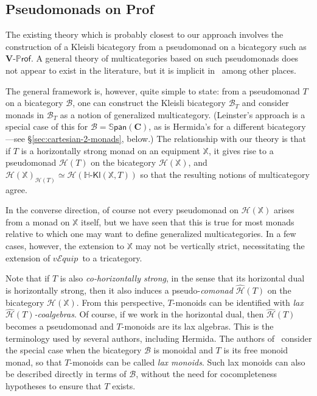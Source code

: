\documentclass{tac}
\makeatletter
\newcommand{\calH}{\ensuremath{\mathcal{H}}}
\newcommand{\mb}[1]{{\mathbf{#1}}}
\newcommand{\PROF}[1]{\mathbf{#1}\mbox{-}\mathbb{P}\mathsf{rof}}
\newcommand{\SPAN}[1]{\mathbb{S}\mathsf{pan}\!\left(\mb{#1}\right)}
\newcommand{\vEquip}{\ensuremath{\mathit{v}\mathcal{E}\!\mathit{quip}}}
\newcommand{\Hkl}[2]{\mathbb{H}\text{-}\mathsf{Kl}(\mathbb{#1},#2)}
\numberwithin{equation}{section}
\def\currthmtype{}
\let\old@label\label
\def\label#1{%
    {\let\your@currentlabel\@currentlabel%
      \edef\@currentlabel{\currthmtype}%
      \old@label{label@name@#1}}%
    \old@label{#1}}
\makeatother
\begin{document}
\subsection{Pseudomonads on Prof}
\label{sec:pseudomonads-prof}

The existing theory which is probably closest to our approach involves
the construction of a Kleisli bicategory from a pseudomonad on a
bicategory such as $\PROF{V}$.  A general theory of multicategories
based on such pseudomonads does not appear to exist in the literature,
but it is implicit
in~\cite{bd:hda3,cheng:opetopic,fghw:gen-species,garner:polycats,ds:lmpo-conv}
among other places.

The general framework is, however, quite simple to state: from a
pseudomonad $T$ on a bicategory $\mathcal{B}$, one
can construct the Kleisli bicategory $\mathcal{B}_T$ and consider
monads in $\mathcal{B}_T$ as a notion of generalized multicategory.
(Leinster's approach is a special case of this for
$\mathcal{B}=\SPAN{C}$, as is Hermida's for a different
bicategory---see \S\ref{sec:cartesian-2-monads}, below.)
The relationship with our theory is that if $T$ is a horizontally
strong monad on an equipment $\mathbb{X}$, it gives rise to a
pseudomonad $\calH(T)$ on the bicategory $\calH(\mathbb{X})$, and
$\calH(\mathbb{X})_{\calH(T)} \simeq \calH(\Hkl{\mathbb{X}}{T})$ so
that the resulting notions of multicategory agree.

In the converse direction, of course not every pseudomonad on
$\calH(\mathbb{X})$ arises from a monad on $\mathbb{X}$ itself, but we
have seen that this is true for most monads relative to which one may
want to define generalized multicategories.  In a few cases, however,
the extension to $\mathbb{X}$ may not be vertically strict,
necessitating the extension of \vEquip\ to a tricategory.

Note that if $T$ is also \emph{co-horizontally strong}, in the sense
that its horizontal dual is horizontally strong, then it also induces
a pseudo-\emph{comonad} \(\hat{\calH}(T)\) on the bicategory
$\calH(\mathbb{X})$.  From this perspective, $T$-monoids can be
identified with \emph{lax $\hat{\calH}(T)$-coalgebras}.  Of course, if
we work in the horizontal dual, then \(\hat{\calH}(T)\) becomes a
pseudomonad and $T$-monoids are its lax algebras.  This is the
terminology used by several authors, including Hermida.  The authors
of~\cite{ds:lmpo-conv} consider the special case when the bicategory
$\mathcal{B}$ is monoidal and $T$ is its free monoid monad, so that
$T$-monoids can be called \emph{lax monoids}.  Such lax monoids can
also be described directly in terms of $\mathcal{B}$, without the need
for cocompleteness hypotheses to ensure that $T$ exists.
\end{document}
